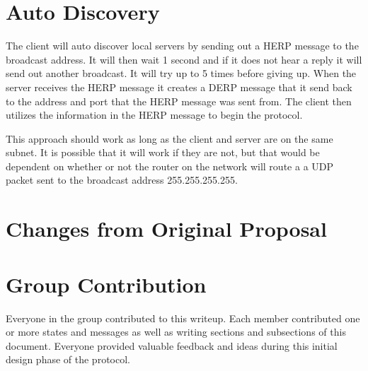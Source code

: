 \documentclass[12pt,letterpaper,titlepage]{article}
\begin{document}
\section{Auto Discovery}
The client will auto discover local servers by sending out a HERP message to the broadcast address. It will then wait 1 second and if it does not hear a reply it will send out another broadcast. It will try up to 5
times before giving up. When the server receives the HERP message it creates a DERP message that it send back to the address and port that the HERP message was sent from. The client then utilizes the information in the
HERP message to begin the protocol.

This approach should work as long as the client and server are on the same subnet. It is possible that it will work if they are not, but that would be dependent on whether or not the router on the network will route a
a UDP packet sent to the broadcast address 255.255.255.255.

\section{Changes from Original Proposal}


\section{Group Contribution}
Everyone in the group contributed to this writeup. Each member contributed one or more states and messages as well as writing sections and subsections of this document. Everyone provided valuable feedback and ideas during this initial design phase of the protocol.
\end{document}
